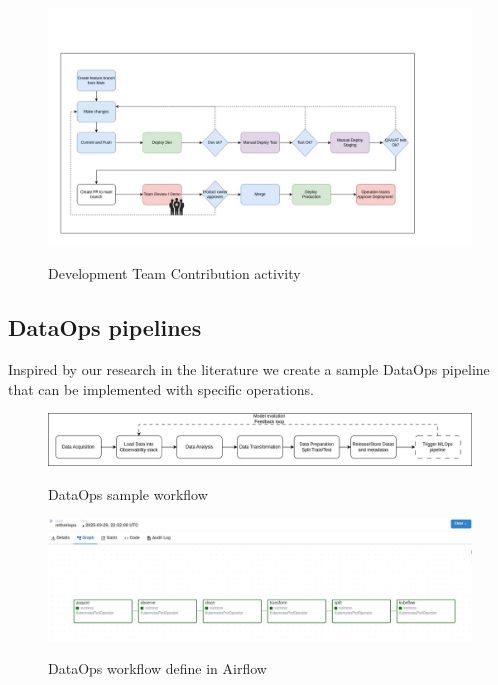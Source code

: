 \begin{figure}[!htbp]
    \centering
    \caption{Development Team Contribution activity}
    \includegraphics[scale=0.3]{images/project/cicd-workflow-p2}
    \label{fig:cd-workflow-p2}
\end{figure}


\subsection{DataOps pipelines}\label{subsec:dataops-pipelines}
Inspired by our research in the literature we create a sample DataOps pipeline that can be implemented with specific
operations.

\begin{figure}[!htbp]
    \centering
    \caption{DataOps sample workflow}
    \includegraphics[scale=0.3]{images/project/dataops-workflow}
    \label{fig:dataops-workflow}
\end{figure}

\begin{figure}[!htbp]
    \centering
    \caption{DataOps workflow define in Airflow}
    \includegraphics[scale=0.3]{images/project/dataops-workflow-airflow}
    \label{fig:dataops-workflow-airflow}
\end{figure}

